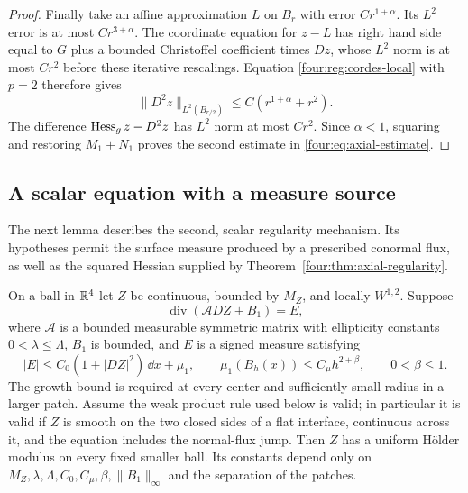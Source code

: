 \begin{proof}
Finally take an affine approximation $L$ on $B_r$ with error
$Cr^{1+\alpha}$.  Its $L^2$ error is at most $Cr^{3+\alpha}$.
The coordinate equation for $z-L$ has right hand side equal to
$G$ plus a bounded Christoffel coefficient times $Dz$, whose
$L^2$ norm is at most $Cr^2$ before these iterative rescalings.
Equation \eqref{four:reg:cordes-local} with $p=2$ therefore gives
\[
 \|D^2z\|_{L^2(B_{r/2})}\le C(r^{1+\alpha}+r^2).
\]
The difference $\operatorname{Hess}_gz-D^2z$ has $L^2$ norm at most $Cr^2$.
Since $\alpha<1$, squaring and restoring $M_1+N_1$ proves the
second estimate in \eqref{four:eq:axial-estimate}.
\end{proof}

\subsection{A scalar equation with a measure source}

The next lemma describes the second, scalar regularity mechanism.
Its hypotheses permit the surface measure produced by a prescribed
conormal flux, as well as the squared Hessian supplied by
Theorem~\ref{four:thm:axial-regularity}.

\begin{lemma}\label{four:reg:natural-growth}
On a ball in $\mathbb R^4$ let $Z$ be continuous, bounded by $M_Z$, and
locally $W^{1,2}$.  Suppose
\begin{equation}\label{four:reg:natural-equation}
 \operatorname{div}(\mathcal A DZ+B_1)=E,
\end{equation}
where $\mathcal A$ is a bounded measurable symmetric matrix with
ellipticity constants $0<\lambda\le\Lambda$, $B_1$ is bounded, and
$E$ is a signed measure satisfying
\begin{equation}\label{four:reg:natural-growth-bound}
 |E|\le C_0(1+|DZ|^2)\,\dd x+\mu_1,\qquad
 \mu_1(B_h(x))\le C_\mu h^{2+\beta},\qquad 0<\beta\le1.
\end{equation}
The growth bound is required at every center and sufficiently small
radius in a larger patch.  Assume the weak product rule used below
is valid; in particular it is valid if $Z$ is smooth on the two
closed sides of a flat interface, continuous across it, and the
equation includes the normal-flux jump.  Then $Z$ has a uniform
H\"older modulus on every fixed smaller ball.  Its constants depend
only on $M_Z,\lambda,\Lambda,C_0,C_\mu,\beta,\|B_1\|_\infty$ and
the separation of the patches.
\end{lemma}

